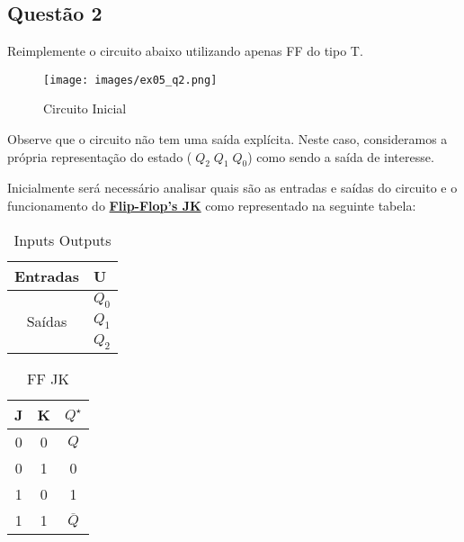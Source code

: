 \documentclass{article}
\begin{document}
\subsection{Questão 2}
    \begin{exercise}
        Reimplemente o circuito abaixo utilizando apenas FF do tipo T.
        \begin{figure}[H]
            \centering
            \texttt{[image: images/ex05\_q2.png]}
            \caption{Circuito Inicial}
        \end{figure}
        Observe que o circuito não tem uma saída explícita. Neste caso, consideramos a própria representação do estado ($\; Q_2 \; Q_1 \; Q_0$) como sendo a saída de interesse.
    \end{exercise}
    \begin{resolution}
        Inicialmente será necessário analisar quais são as entradas e saídas do circuito e o funcionamento do \href{https://en.wikipedia.org/wiki/Flip-flop_(electronics)}{\textbf{Flip-Flop's JK}} como representado na seguinte tabela:
        \begin{center}
            \begin{minipage}{0.3\linewidth}
            \begin{table}[H]
            \centering\begin{tabular}[]{cl}
                Entradas                & U    \\\hline
                \multirow{3}{*}{Saídas} & $Q_0$\\
                                        & $Q_1$\\
                                        & $Q_2$\\\hline
            \end{tabular}\caption{Inputs Outputs}
            \end{table}
        \end{minipage}
        \begin{minipage}{0.3\linewidth}
            \begin{table}[H]
            \centering\begin{tabular}[]{cc|c}
                J & K & $Q^\star$\\\hline
                0 & 0 & $Q$\\
                0 & 1 & 0\\
                1 & 0 & 1\\
                1 & 1 & $\overline{Q}$\\\hline
            \end{tabular}\caption{FF JK}

\end{table}
\end{minipage}
\end{center}
\end{resolution}
\end{document}
